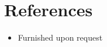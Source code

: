 \documentclass[letterpaper,11pt]{article}
\makeatletter
\newcommand{\resumeOrganizationHeading}[4]{
  \vspace{-2pt}\item
    \begin{tabular*}{0.97\textwidth}[t]{l@{\extracolsep{\fill}}r}
      \textbf{#1} & \textit{\small #2} \\
      \textit{\small#3}
    \end{tabular*}\vspace{-7pt}
}
\newcommand{\resumeSubHeadingListStart}{\begin{itemize}[leftmargin=0.15in, label={}]}
\newcommand{\resumeSubHeadingListEnd}{\end{itemize}}
\makeatother
\begin{document}
    
    








\section{References}
  \resumeSubHeadingListStart
  	\item {Furnished upon request}
  \resumeSubHeadingListEnd



\end{document}

